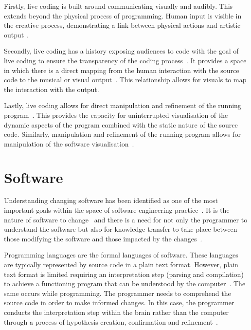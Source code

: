 Firstly, live coding is built around communicating visually and audibly. This extends beyond the physical process of programming. Human input is visible in the creative process, demonstrating a link between physical actions and artistic output \cite{Mclean}.

Secondly, live coding has a history exposing audiences to code with the goal of live coding to ensure the transparency of the coding process~\cite{Collins2011,McLean2010a}. It provides a space in which there is a direct mapping from the human interaction with the source code to the musical or visual output~\cite{Mclean}. This relationship allows for visuals to map the interaction with the output.

Lastly, live coding allows for direct manipulation and refinement of the running program~\cite{Swift2013}. This provides the capacity for uninterrupted visualisation of the dynamic aspects of the program combined with the static nature of the source code. Similarly, manipulation and refinement of the running program allows for manipulation of the software visualisation~\cite{McLean2010a}.




\section{Software}

Understanding changing software has been identified as one of the most important goals within the space of software engineering practice~\cite{Tao2012}. It is the nature of software to change~\cite{Brooks1995} and there is a need for not only the programmer to understand the software but also for knowledge transfer to take place between those modifying the software and those impacted by the changes~\cite{Tao2012}.

Programming languages are the formal languages of software. These languages are typically represented by source code in a plain text format. However, plain text format is limited requiring an interpretation step (parsing and compilation) to achieve a functioning program that can be understood by the computer~\cite{Badros2000}. The same occurs while programming. The programmer needs to comprehend the source code in order to make informed changes. In this case, the programmer conducts the interpretation step within the brain rather than the computer through a process of hypothesis creation, confirmation and refinement~\cite{Brooks1983}.

